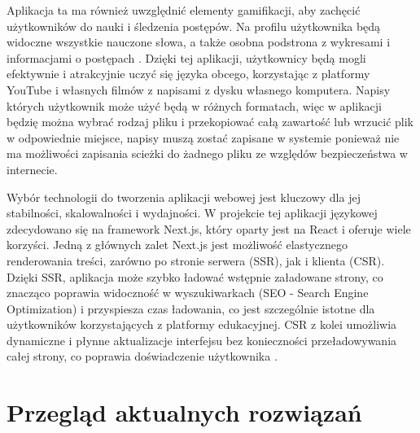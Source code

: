 Aplikacja ta ma również uwzględnić elementy gamifikacji, aby zachęcić użytkowników do nauki i śledzenia postępów. Na profilu użytkownika będą widoczne wszystkie nauczone słowa, a także osobna podstrona z wykresami i informacjami o postępach \cite{6827214}. Dzięki tej aplikacji, użytkownicy będą mogli efektywnie i atrakcyjnie uczyć się języka obcego, korzystając z platformy YouTube i własnych filmów z napisami z dysku własnego komputera. Napisy których użytkownik może użyć będą w różnych formatach, więc w aplikacji będzię można wybrać rodzaj pliku i przekopiować całą zawartość lub wrzucić plik w odpowiednie miejsce, napisy muszą zostać zapisane w systemie ponieważ nie ma możliwości zapisania scieżki do żadnego pliku ze względów bezpieczeństwa w internecie.

Wybór technologii do tworzenia aplikacji webowej jest kluczowy dla jej stabilności, skalowalności i wydajności. W projekcie tej aplikacji językowej zdecydowano się na framework Next.js, który oparty jest na React i oferuje wiele korzyści. Jedną z głównych zalet Next.js jest możliwość elastycznego renderowania treści, zarówno po stronie serwera (SSR), jak i klienta (CSR). Dzięki SSR, aplikacja może szybko ładować wstępnie załadowane strony, co znacząco poprawia widoczność w wyszukiwarkach (SEO - Search Engine Optimization) i przyspiesza czas ładowania, co jest szczególnie istotne dla użytkowników korzystających z platformy edukacyjnej. CSR z kolei umożliwia dynamiczne i płynne aktualizacje interfejsu bez konieczności przeładowywania całej strony, co poprawia doświadczenie użytkownika \cite{bui2023next}.


\section{Przegląd aktualnych rozwiązań}

